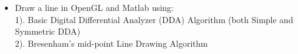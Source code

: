 


\usepackage[pdfauthor={Name}, pdftitle={Weekly}, pdfsubject={Week 1}, pdfkeywords={},colorlinks=true,urlcolor=black,linkcolor=black, citecolor=black]{hyperref}
\usepackage{listings}
\usepackage{subfig}
\usepackage{graphicx}




\renewcommand{\labelitemi}{\textcolor{main}{\small $\blacktriangleright$}}
\renewcommand{\labelitemii}{\textcolor{second}{\scriptsize \textbullet}}


\begin{enbref}
\begin{itemize}
\item Draw a line in OpenGL and Matlab using:\\
1). Basic Digital Differential Analyzer (DDA) Algorithm (both Simple and Symmetric DDA)\\
2). Bresenham’s mid-point Line Drawing Algorithm
\end{itemize}
\medskip

\end{enbref}


\vspace{0.5mm} \flushleft


